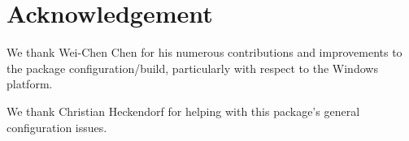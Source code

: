 \section*{Acknowledgement}

We thank Wei-Chen Chen for his numerous contributions and improvements to the 
package configuration/build, particularly with respect to the Windows platform.

We thank Christian Heckendorf for helping with this
package's general configuration issues.  